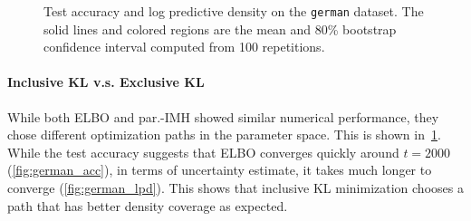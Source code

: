 \begin{figure}[h]
  \centering
    \vspace{-0.05in}
  \caption{Test accuracy and log predictive density on the \texttt{german} dataset.
    The solid lines and colored regions are the mean and 80\% bootstrap confidence interval computed from 100 repetitions.
  }\label{fig:logistic}
  \vspace{-0.1in}
\end{figure}
%
  \vspace{-0.1in}
\paragraph{Inclusive KL v.s. Exclusive KL}
While both ELBO and par.-IMH showed similar numerical performance, they chose different optimization paths in the parameter space.
This is shown in~\cref{fig:logistic}.
While the test accuracy suggests that ELBO converges quickly around \(t=2000\) (\cref{fig:german_acc}), in terms of uncertainty estimate, it takes much longer to converge (\cref{fig:german_lpd}).
This shows that inclusive KL minimization chooses a path that has better density coverage as expected.

